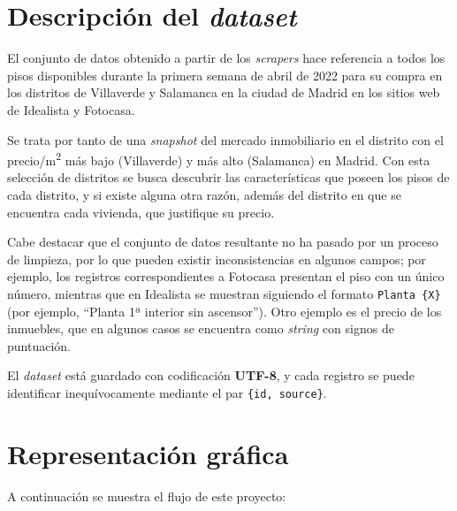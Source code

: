 \documentclass[12pt]{article}
\begin{document}

\vspace{-1.5em}\section{Descripción del \textit{dataset}}\vspace{-1.0em}

El conjunto de datos obtenido a partir de los \textit{scrapers} hace referencia a todos los pisos disponibles durante la primera semana de abril de 2022 para su compra en los distritos de Villaverde y Salamanca en la ciudad de Madrid en los sitios web de Idealista y Fotocasa.

Se trata por tanto de una \textit{snapshot} del mercado inmobiliario en el distrito con el precio/m\textsuperscript{2} más bajo (Villaverde) y más alto (Salamanca) en Madrid. Con esta selección de distritos se busca descubrir las características que poseen los pisos de cada distrito, y si existe alguna otra razón, además del distrito en que se encuentra cada vivienda, que justifique su precio.

Cabe destacar que el conjunto de datos resultante no ha pasado por un proceso de limpieza, por lo que pueden existir inconsistencias en algunos campos; por ejemplo, los registros correspondientes a Fotocasa presentan el piso con un único número, mientras que en Idealista se muestran siguiendo el formato \verb|Planta {X}| (por ejemplo, ``Planta 1ª interior sin ascensor''). Otro ejemplo es el precio de los inmuebles, que en algunos casos se encuentra como \textit{string} con signos de puntuación.

El \textit{dataset} está guardado con codificación \textbf{UTF-8}, y cada registro se puede identificar inequívocamente mediante el par \verb|{id, source}|.

\vspace{-1.5em}\section{Representación gráfica}\vspace{-1.0em}

A continuación se muestra el flujo de este proyecto:
\end{document}
